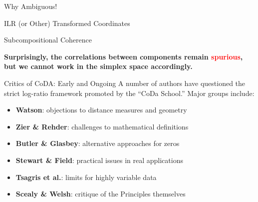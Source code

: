 \begin{frame}{Why Ambiguous!}
{\begin{block}{ILR (or Other) Transformed Coordinates}
\end{block}


\begin{alertblock}{Subcompositional Coherence}
\begin{center}
\textbf{\large Surprisingly, the correlations between components remain \textcolor{red}{spurious}, 
but we cannot work in the simplex space accordingly.}
\end{center}
\end{alertblock}
}




\end{frame}



\begin{frame}{Critics of CoDA: Early and Ongoing}
A number of authors have questioned the strict log-ratio framework
promoted by the “CoDa School.” Major groups include:
\scriptsize   %


\begin{itemize}\itemsep1pt
    \item \textbf{Watson}: objections to distance measures and geometry
    \item \textbf{Zier \& Rehder}: challenges to mathematical definitions
    \item \textbf{Butler \& Glasbey}: alternative approaches for zeros
    \item \textbf{Stewart \& Field}: practical issues in real applications
    \item \textbf{Tsagris et al.}: limits for highly variable data
    \item \textbf{Scealy \& Welsh}: critique of the Principles themselves
\end{itemize}



\end{frame}




